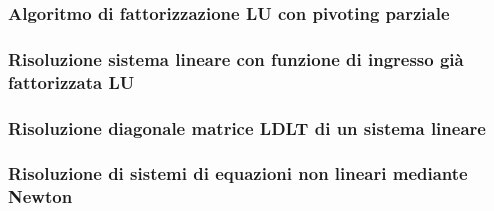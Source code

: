 \subsubsection{Algoritmo di fattorizzazione LU con pivoting parziale}


\subsubsection{Risoluzione sistema lineare con funzione di ingresso già fattorizzata LU}


\subsubsection{Risoluzione diagonale matrice LDLT di un sistema lineare}

\subsubsection{Risoluzione di sistemi di equazioni non lineari mediante Newton}


